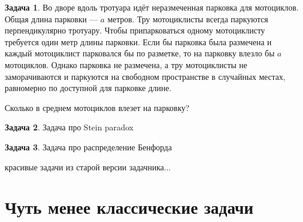 \documentclass[nobib]{tufte-handout}
\theoremstyle{definition}
\newtheorem{problem}{Задача}
\begin{document}
\begin{problem}
Во дворе вдоль тротуара идёт неразмеченная парковка для мотоциклов. Общая длина парковки — $a$ метров. Тру мотоциклисты всегда паркуются перпендикулярно тротуару. Чтобы припарковаться одному мотоциклисту требуется один метр длины парковки. Если бы парковка была размечена и каждый мотоциклист парковался бы по разметке, то на парковку влезло бы $a$ мотоциклов. Однако парковка не размечена, а тру мотоциклисты не заморачиваются и паркуются на свободном пространстве в случайных местах, равномерно по доступной для парковке длине.

Сколько в среднем мотоциклов влезет на парковку?
\begin{sol}

\end{sol}

\end{problem}



\begin{problem}
Задача про Stein paradox


\begin{sol}

\end{sol}

\end{problem}


\begin{problem}
Задача про распределение Бенфорда


\begin{sol}

\end{sol}

\end{problem}



красивые задачи из старой версии задачника...

\section{Чуть менее классические задачи}
\end{document}
